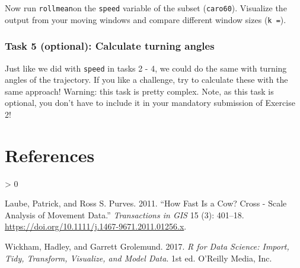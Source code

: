 \documentclass[
]{book}
\newlength{\cslhangindent}
\newenvironment{CSLReferences}[2] %
 {%
  \setlength{\parindent}{0pt}
  \ifodd #1 \everypar{\setlength{\hangindent}{\cslhangindent}}\ignorespaces\fi
  \ifnum #2 > 0
  \setlength{\parskip}{#2\baselineskip}
  \fi
 }%
 {}
\begin{document}
Now run \texttt{rollmean}on the \texttt{speed} variable of the subset (\texttt{caro60}). Visualize the output from your moving windows and compare different window sizes (\texttt{k\ =}).

\hypertarget{task-5-optional-calculate-turning-angles}{%
\subsection{Task 5 (optional): Calculate turning angles}\label{task-5-optional-calculate-turning-angles}}

Just like we did with \texttt{speed} in tasks 2 - 4, we could do the same with turning angles of the trajectory. If you like a challenge, try to calculate these with the same approach! Warning: this task is pretty complex. Note, as this task is optional, you don't have to include it in your mandatory submission of Exercise 2!

\hypertarget{references}{%
\chapter*{References}\label{references}}

\hypertarget{refs}{}
\begin{CSLReferences}{1}{0}
\leavevmode\hypertarget{ref-laube2011}{}%
Laube, Patrick, and Ross S. Purves. 2011. {``How Fast Is a Cow? Cross - Scale Analysis of Movement Data.''} \emph{Transactions in GIS} 15 (3): 401--18. \url{https://doi.org/10.1111/j.1467-9671.2011.01256.x}.

\leavevmode\hypertarget{ref-wickham2017}{}%
Wickham, Hadley, and Garrett Grolemund. 2017. \emph{R for Data Science: Import, Tidy, Transform, Visualize, and Model Data}. 1st ed. O'Reilly Media, Inc.

\end{CSLReferences}
\end{document}

